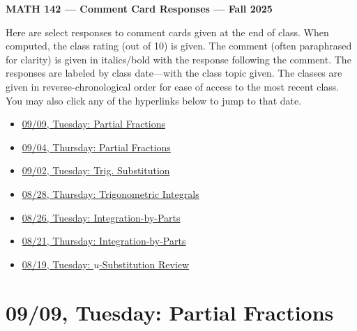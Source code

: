 \documentclass[11pt,letterpaper]{article}
\begin{document}
\begin{center} {\bfseries \LARGE MATH 142 --- Comment Card Responses --- Fall 2025} \end{center}

Here are select responses to comment cards given at the end of class. When computed, the class rating (out of 10) is given. The comment (often paraphrased for clarity) is given in italics/bold with the response following the comment. The responses are labeled by class date---with the class topic given. The classes are given in reverse-chronological order for ease of access to the most recent class. You may also click any of the hyperlinks below to jump to that date.

\begin{itemize}
\item \hyperref[09-09]{09/09, Tuesday: Partial Fractions}
\item \hyperref[09-04]{09/04, Thursday: Partial Fractions}
\item \hyperref[09-02]{09/02, Tuesday: Trig. Substitution}
\item \hyperref[08-28]{08/28, Thursday: Trigonometric Integrals}
\item \hyperref[08-26]{08/26, Tuesday: Integration-by-Parts}
\item \hyperref[08-21]{08/21, Thursday: Integration-by-Parts}
\item \hyperref[08-19]{08/19, Tuesday: $u$-Substitution Review}
\end{itemize}

\newpage
\section*{09/09, Tuesday: Partial Fractions\label{09-09}}
\end{document}
